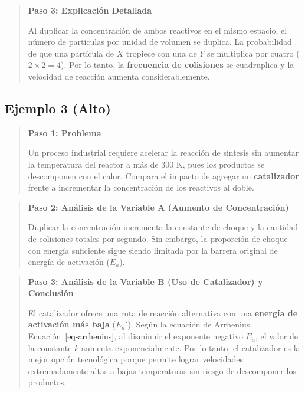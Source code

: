 \documentclass[
  spanish,
  letterpaper,
  12pt,
  oneside,
  open=any,
  DIV=15]{scrbook}
\newcommand{\setcolorsection}[2]{%
  \definecolor{currentsectionbg}{HTML}{#1}%
  \definecolor{currentsectionborder}{HTML}{#2}%
}
\begin{document}
\begin{tcolorbox}
\begin{quote}
\textbf{Paso 3: Explicación Detallada}

Al duplicar la concentración de ambos reactivos en el mismo espacio, el
número de partículas por unidad de volumen se duplica. La probabilidad
de que una partícula de \(X\) tropiece con una de \(Y\) se multiplica
por cuatro (\(2 \times 2 = 4\)). Por lo tanto, la \textbf{frecuencia de
colisiones} se cuadruplica y la velocidad de reacción aumenta
considerablemente.
\end{quote}

\subsection{Ejemplo 3 (Alto)}\label{ejemplo-3-alto-7}

\begin{quote}
\textbf{Paso 1: Problema}

Un proceso industrial requiere acelerar la reacción de síntesis sin
aumentar la temperatura del reactor a más de 300 K, pues los productos
se descomponen con el calor. Compara el impacto de agregar un
\textbf{catalizador} frente a incrementar la concentración de los
reactivos al doble.
\end{quote}

\begin{quote}
\textbf{Paso 2: Análisis de la Variable A (Aumento de Concentración)}

Duplicar la concentración incrementa la constante de choque y la
cantidad de colisiones totales por segundo. Sin embargo, la proporción
de choque con energía suficiente sigue siendo limitada por la barrera
original de energía de activación (\(E_a\)).
\end{quote}

\begin{quote}
\textbf{Paso 3: Análisis de la Variable B (Uso de Catalizador) y
Conclusión}

El catalizador ofrece una ruta de reacción alternativa con una
\textbf{energía de activación más baja} (\(E_a'\)). Según la ecuación de
Arrhenius Ecuación~\ref{eq-arrhenius}, al disminuir el exponente
negativo \(E_a\), el valor de la constante \(k\) aumenta
exponencialmente. Por lo tanto, el catalizador es la mejor opción
tecnológica porque permite lograr velocidades extremadamente altas a
bajas temperaturas sin riesgo de descomponer los productos.
\end{quote}

\setcolorsection{b2e0d8}{98ccc4}


\end{tcolorbox}
\end{document}
